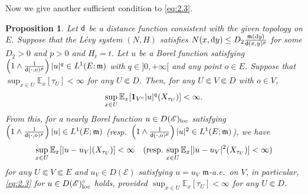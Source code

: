 \documentclass[12pt,a4paper]{article}
\newtheorem{prop}[thm]{Proposition}
\newcommand{\E}{\mathbb{E}}
\renewcommand{\d}{\mathrm{d}}
\newcommand{\m}{\mathfrak{m} }
\newcommand{\loc}{{\rm loc}}
\newcommand{\1}{{\bf 1}}
\begin{document}
Now we give another sufficient condition to \eqref{eq:2.3}. 
\begin{prop}\label{prop:sufficient{eq:2.3}}
Let ${\sf d}$ be a distance function consistent with the given topology on 
 $E$.
Suppose that the L\'evy system $(N,H)$ satisfies  
$N(x,{\d} y)\leq D_2\frac{{\m}({\d} y)}{{\sf d}(x,y)^p}$ for some $D_2>0$ and  $p>0$ and $H_t=t$. 
Let $u$ be a Borel function satisfying $\left(1\land \frac{1}{{\sf d}(\cdot,o)^p} \right)|u|^q\in L^1(E;{\m})$ with $q\in]0,+\infty[$ and any point $o\in E$.  
Suppose that $\sup_{x\in U}\E_x[\tau_U]<\infty$ for any $U\Subset D$. 
Then, for any $U\Subset V\Subset D$ with $o\in V$, 
\begin{align}
\sup_{x\in U}\E_x[\1_{V^c}|u|^q(X_{\tau_U})]<\infty.\label{eq:1}
\end{align}
From this, for a nearly Borel function $u\in D(\mathscr{E})_{\loc}$ 
satisfying $\left(1\land \frac{1}{{\sf d}(\cdot,o)^p} \right)|u|\in L^1(E;{\m})$ {\rm(}resp.~$\left(1\land \frac{1}{{\sf d}(\cdot,o)^p} \right)|u|^2\in L^1(E;{\m})${\rm)}, we have 
\begin{align}
\sup_{x\in U}\E_x[|u-u_V|(X_{\tau_U})]<\infty\quad 
\text{{\rm(}resp.~$\sup_{x\in U}\E_x[|u-u_V|^2(X_{\tau_U})]<\infty${\rm)}}\label{eq:Finiteness}
\end{align}
for any $U\Subset V\Subset E$ and $u_V\in D(\mathscr{E})$ satisfying $u=u_V$ ${\m}$-a.e.~on $V$, in particular, \eqref{eq:2.3} for $u\in D(\mathscr{E})^{\diamond}_{\loc}$ holds, 
provided $\sup_{x\in U}\E_x[\tau_U]<\infty$ for any $U\Subset D$.
\end{prop}
\end{document}
